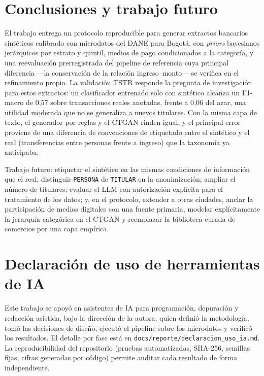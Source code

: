 \documentclass[journal]{IEEEtai}
\begin{document}
\section{Conclusiones y trabajo futuro}
El trabajo entrega un protocolo reproducible para generar extractos bancarios sintéticos calibrado con microdatos del DANE para Bogotá, con \textit{priors} bayesianos jerárquicos por estrato y quintil, medios de pago condicionados a la categoría, y una reevaluación prerregistrada del pipeline de referencia cuya principal diferencia —la conservación de la relación ingreso--monto— se verifica en el refinamiento propio. La validación TSTR responde la pregunta de investigación para estos extractos: un clasificador entrenado solo con sintético alcanza un F1-macro de 0{,}57 sobre transacciones reales anotadas, frente a 0{,}06 del azar, una utilidad moderada que no se generaliza a nuevos titulares. Con la misma capa de texto, el generador por reglas y el CTGAN rinden igual, y el principal error proviene de una diferencia de convenciones de etiquetado entre el sintético y el real (transferencias entre personas frente a ingreso) que la taxonomía ya anticipaba.

Trabajo futuro: etiquetar el sintético en las mismas condiciones de información que el real; distinguir \texttt{PERSONA} de \texttt{TITULAR} en la anonimización; ampliar el número de titulares; evaluar el LLM con autorización explícita para el tratamiento de los datos; y, en el protocolo, extender a otras ciudades, anclar la participación de medios digitales con una fuente primaria, modelar explícitamente la jerarquía categórica en el CTGAN y reemplazar la biblioteca curada de comercios por una capa empírica.

\section*{Declaración de uso de herramientas de IA}
Este trabajo se apoyó en asistentes de IA para programación, depuración y redacción asistida, bajo la dirección de la autora, quien definió la metodología, tomó las decisiones de diseño, ejecutó el pipeline sobre los microdatos y verificó los resultados. El detalle por fase está en \texttt{docs/reporte/declaracion\_uso\_ia.md}. La reproducibilidad del repositorio (pruebas automatizadas, SHA-256, semillas fijas, cifras generadas por código) permite auditar cada resultado de forma independiente.
\end{document}
